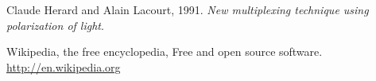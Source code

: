 \documentclass[a4paper,12pt]{report}
\begin{document}
\maketitle{}

\newpage
\tableofcontents{}

\newpage
\listoffigures{}


\newpage


\newpage
%
\newpage
%
\newpage
%
\newpage
%
\newpage
%
\newpage

\newpage
%
\newpage
%
\newpage
%
\newpage
%



\begin{thebibliography}{99}

 Claude Herard and Alain Lacourt, 1991.
  \textit{New multiplexing technique using polarization of light}.


Wikipedia, the free encyclopedia, Free and open source software.
\url{http://en.wikipedia.org}

\end{thebibliography}
\end{document}
